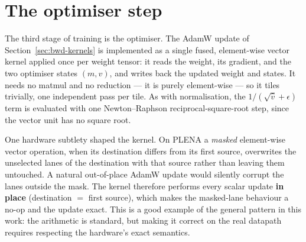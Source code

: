 \documentclass[11pt]{report}
\begin{document}
\begin{algorithm}[H]
\DontPrintSemicolon
{}
\caption{Norm backward: recompute statistic, reduce, combine (vector)}
\end{algorithm}

\section{The optimiser step}
\label{sec:impl-adamw}

The third stage of training is the optimiser. The AdamW update of
Section~\ref{sec:bwd-kernels} is implemented as a single fused,
element-wise vector kernel applied once per weight tensor: it reads the
weight, its gradient, and the two optimiser states $(m,v)$, and writes back
the updated weight and states. It needs no matmul and no reduction --- it is
purely element-wise --- so it tiles trivially, one independent pass per
tile. As with normalisation, the $1/(\sqrt{\hat v}+\epsilon)$ term is
evaluated with one Newton--Raphson reciprocal-square-root step, since the
vector unit has no square root.

\begin{algorithm}[H]
\DontPrintSemicolon
{}
\caption{AdamW: fused element-wise update, in place}
\end{algorithm}

One hardware subtlety shaped the kernel. On PLENA a \emph{masked}
element-wise vector operation, when its destination differs from its first
source, overwrites the unselected lanes of the destination with that source
rather than leaving them untouched. A natural out-of-place AdamW update would
silently corrupt the lanes outside the mask. The kernel therefore performs
every scalar update \textbf{in place} (destination $=$ first source), which
makes the masked-lane behaviour a no-op and the update exact. This is a good
example of the general pattern in this work: the arithmetic is standard, but
making it correct on the real datapath requires respecting the hardware's
exact semantics.
\end{document}
